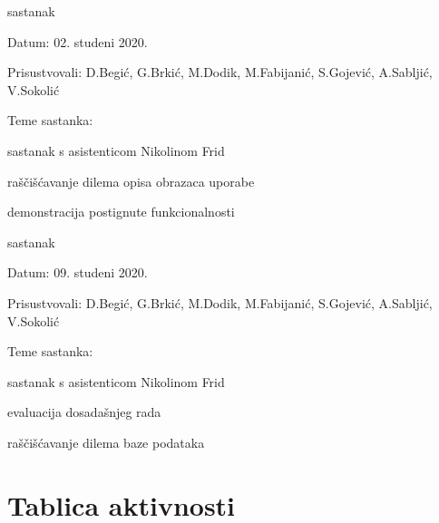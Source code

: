 \begin{packed_enum}
			\item  sastanak
			\item[] \begin{packed_item}
				\item Datum: 02. studeni 2020.
				\item Prisustvovali: D.Begić, G.Brkić, M.Dodik, M.Fabijanić, S.Gojević, A.Sabljić, V.Sokolić
				\item Teme sastanka:
				\begin{packed_item}
					\item  sastanak s asistenticom Nikolinom Frid
					\item  raščišćavanje dilema opisa obrazaca uporabe
					\item demonstracija postignute funkcionalnosti
				\end{packed_item}
			\end{packed_item}
		
			\item  sastanak
			\item[] \begin{packed_item}
				\item Datum: 09. studeni 2020.
				\item Prisustvovali: D.Begić, G.Brkić, M.Dodik, M.Fabijanić, S.Gojević, A.Sabljić, V.Sokolić
				\item Teme sastanka:
				\begin{packed_item}
					\item  sastanak s asistenticom Nikolinom Frid
					\item  evaluacija dosadašnjeg rada
					\item raščišćavanje dilema baze podataka
				\end{packed_item}
			\end{packed_item}
			
		\end{packed_enum}
		
		\eject
		\section*{Tablica aktivnosti}
	
